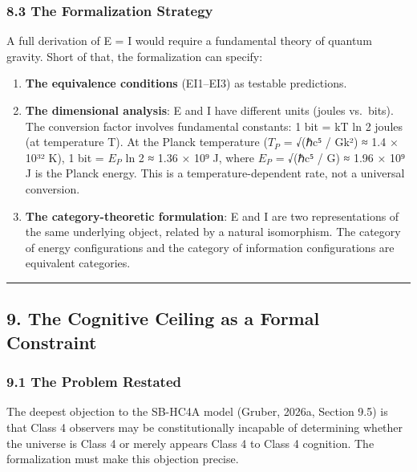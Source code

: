 \documentclass[
]{article}
\providecommand{\tightlist}{%
  \setlength{\itemsep}{0pt}\setlength{\parskip}{0pt}}
\begin{document}
\hypertarget{the-formalization-strategy}{%
\subsubsection{8.3 The Formalization
Strategy}\label{the-formalization-strategy}}

A full derivation of E = I would require a fundamental theory of quantum
gravity. Short of that, the formalization can specify:

\begin{enumerate}
\def\labelenumi{\arabic{enumi}.}
\tightlist
\item
  \textbf{The equivalence conditions} (EI1--EI3) as testable
  predictions.
\item
  \textbf{The dimensional analysis}: E and I have different units
  (joules vs.~bits). The conversion factor involves fundamental
  constants: 1 bit = kT ln 2 joules (at temperature T). At the Planck
  temperature (\(T_{P}\) = √(ℏc⁵ / Gk²) ≈ 1.4 × 10³² K), 1 bit =
  \(E_{P}\) ln 2 ≈ 1.36 × 10⁹ J, where \(E_{P}\) = √(ℏc⁵ / G) ≈ 1.96 ×
  10⁹ J is the Planck energy. This is a temperature-dependent rate, not
  a universal conversion.
\item
  \textbf{The category-theoretic formulation}: E and I are two
  representations of the same underlying object, related by a natural
  isomorphism. The category of energy configurations and the category of
  information configurations are equivalent categories.
\end{enumerate}

\begin{center}\rule{0.5\linewidth}{0.5pt}\end{center}

\hypertarget{the-cognitive-ceiling-as-a-formal-constraint}{%
\subsection{9. The Cognitive Ceiling as a Formal
Constraint}\label{the-cognitive-ceiling-as-a-formal-constraint}}

\hypertarget{the-problem-restated}{%
\subsubsection{9.1 The Problem Restated}\label{the-problem-restated}}

The deepest objection to the SB-HC4A model (Gruber, 2026a, Section 9.5)
is that Class 4 observers may be constitutionally incapable of
determining whether the universe is Class 4 or merely appears Class 4 to
Class 4 cognition. The formalization must make this objection precise.
\end{document}
